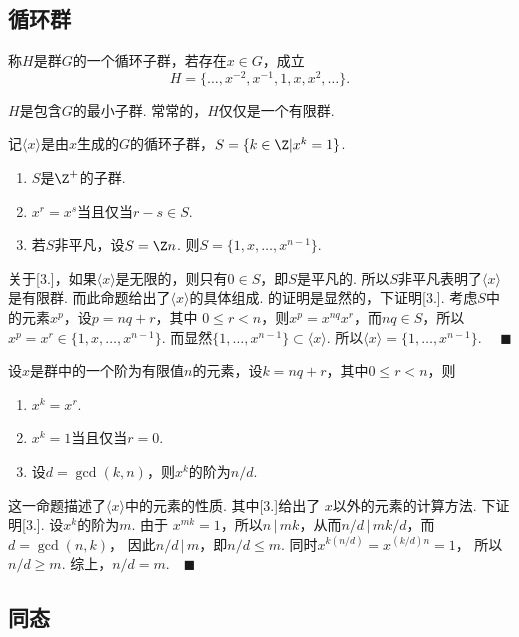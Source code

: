 \subsection{循环群}

  \begin{defi}[循环子群]
    称$H$是群$G$的一个循环子群，若存在$x\in G$，成立
    \[
      H = \{\dots, x^{-2}, x^{-1}, 1, x, x^2, \dots\}.
    \]
  \end{defi}
  \remark
    $H$是包含$G$的最小子群. 常常的，$H$仅仅是一个有限群.

  \begin{thm}
    记$\langle x \rangle$是由$x$生成的$G$的循环子群，$S=\{k\in\Z | x^k=1\}$.
    \begin{enumerate}
      \item $S$是$\Z^+$的子群.
      \item $x^r = x^s$当且仅当$r-s\in S$.
      \item 若$S$非平凡，设$S=\Z n$. 则$S=\{1, x,\dots,x^{n-1}\}$.
    \end{enumerate}
  \end{thm}
  \remark
    关于[3.]，如果$\langle x\rangle$是无限的，则只有$0\in S$，即$S$是平凡的.
    所以$S$非平凡表明了$\langle x \rangle$是有限群. 而此命题给出了$\langle
    x\rangle$的具体组成.
  \proof
    [1. 2.]的证明是显然的，下证明[3.]. 考虑$S$中的元素$x^p$，设$p=nq+r$，其中
    $0\le r < n$，则$x^p = x^{nq}x^r$，而$nq\in S$，所以$x^p=x^r\in
    \{1,x,\dots, x^{n-1}\}$. 而显然$\{1,\dots,x^{n-1}\}\subset\langle
    x\rangle$. 所以$\langle x\rangle = \{1,\dots,x^{n-1}\}$.
    $\quad\blacksquare$

  \begin{pos}
    设$x$是群中的一个阶为有限值$n$的元素，设$k=nq+r$，其中$0\le r<n$，则
    \begin{enumerate}
      \item $x^k = x^r$.
      \item $x^k = 1$当且仅当$r=0$.
      \item 设$d=\gcd(k, n)$，则$x^k$的阶为$n/d$.
    \end{enumerate}
  \end{pos}
  \remark
    这一命题描述了$\langle x\rangle$中的元素的性质. 其中[3.]给出了
    $x$以外的元素的计算方法.
  \proof
    下证明[3.]. 设$x^k$的阶为$m$. 由于
    $x^{mk}=1$，所以$n\,|\,mk$，从而$n/d\,|\,mk/d$，而$d=\gcd(n, k)$，
    因此$n/d\,|\, m$，即$n/d \le m$. 同时$x^{k(n/d)} = x^{(k/d)n}=1$，
    所以$n/d \ge m$. 综上，$n/d = m$.$\quad\blacksquare$

\subsection{同态}

